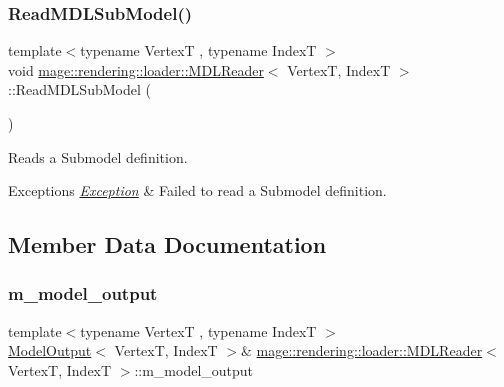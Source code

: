 \subsubsection{\texorpdfstring{Read\+M\+D\+L\+Sub\+Model()}{ReadMDLSubModel()}}
{\footnotesize\ttfamily template$<$typename VertexT , typename IndexT $>$ \\
void \mbox{\hyperlink{classmage_1_1rendering_1_1loader_1_1_m_d_l_reader}{mage\+::rendering\+::loader\+::\+M\+D\+L\+Reader}}$<$ VertexT, IndexT $>$\+::Read\+M\+D\+L\+Sub\+Model (\begin{DoxyParamCaption}{ }\end{DoxyParamCaption})\hspace{0.3cm}{\ttfamily [private]}}

Reads a Submodel definition.


\begin{DoxyExceptions}{Exceptions}
{\em \mbox{\hyperlink{classmage_1_1_exception}{Exception}}} & Failed to read a Submodel definition. \\
\hline
\end{DoxyExceptions}


\subsection{Member Data Documentation}
\mbox{\label{classmage_1_1rendering_1_1loader_1_1_m_d_l_reader_aab6301fae258aaea1619856000a29e53}} 
\subsubsection{\texorpdfstring{m\+\_\+model\+\_\+output}{m\_model\_output}}
{\footnotesize\ttfamily template$<$typename VertexT , typename IndexT $>$ \\
\mbox{\hyperlink{structmage_1_1rendering_1_1_model_output}{Model\+Output}}$<$ VertexT, IndexT $>$\& \mbox{\hyperlink{classmage_1_1rendering_1_1loader_1_1_m_d_l_reader}{mage\+::rendering\+::loader\+::\+M\+D\+L\+Reader}}$<$ VertexT, IndexT $>$\+::m\+\_\+model\+\_\+output\hspace{0.3cm}{\ttfamily [private]}}

